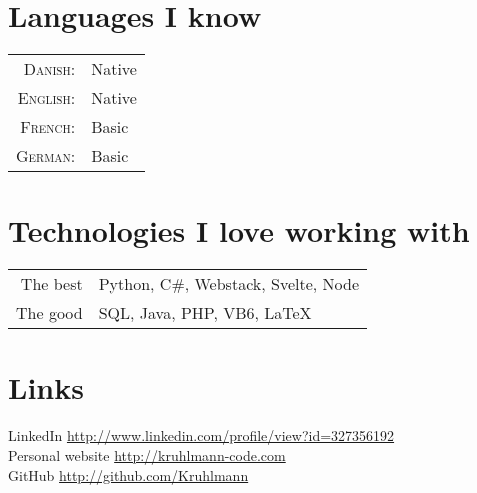 \documentclass[a4paper,10pt]{article}
\begin{document}
\section{Languages I know}
\begin{tabular}{rl}
 \textsc{Danish:}&Native\\
\textsc{English:}&Native\\
\textsc{French:}&Basic\\
\textsc{German:}&Basic\\
\end{tabular}

\section{Technologies I love working with}
\begin{tabular}{rl}
 The best & Python, C\#, Webstack, Svelte, Node\\
 The good & SQL, Java, PHP, VB6, \LaTeX
\end{tabular}

\section{Links}
LinkedIn \href{ http://www.linkedin.com/profile/view?id=327356192}{http://www.linkedin.com/profile/view?id=327356192}\\
Personal website \href{http://kruhlmann-code.com}{http://kruhlmann-code.com}\\
GitHub  \href{http://github.com/Kruhlmann}{http://github.com/Kruhlmann}
\end{document}
